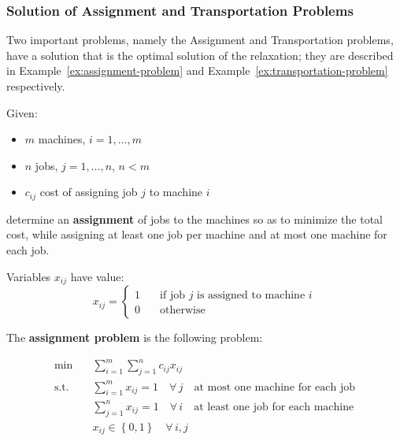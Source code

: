 \documentclass[english]{article}
\begin{document}
\subsubsection{Solution of Assignment and Transportation Problems}

Two important \ILP problems, namely the Assignment and Transportation problems, have a solution that is the optimal solution of the \LP relaxation;
they are described in Example~\ref{ex:assignment-problem} and Example~\ref{ex:transportation-problem} respectively.

\begin{example}
  \label{ex:assignment-problem}

  Given:
  \begin{itemize}
    \item \(m\) machines, \(i = 1, \dots, m\)
    \item \(n\) jobs, \(j = 1, \dots, n\), \(n < m\)
    \item \(c_{ij}\) cost of assigning job \(j\) to machine \(i\)
  \end{itemize}
  determine an \textbf{assignment} of jobs to the machines so as to minimize the total cost, while assigning at least one job per machine and at most one machine for each job.

  Variables \(x_{ij}\) have value:
  \[ x_{ij} = \begin{cases}
      1 \quad & \text{if job } j \text{ is assigned to machine } i \\
      0 \quad & \text{otherwise}
    \end{cases} \]

  The \textbf{assignment problem} is the following \ILP problem:

  \begin{align*}
    \min        & \quad \sum_{i=1}^m \sum_{j=1}^n c_{ij} x_{ij}                                                      \\
    \text{s.t.} & \quad \sum_{i=1}^{m} x_{ij} = 1 \quad \forall \, j \quad \text{at most one machine for each job}   \\
                & \quad \sum_{j=1}^{n} x_{ij} = 1 \quad \forall \, i  \quad \text{at least one job for each machine} \\
                & \quad x_{ij} \in \left\{ 0, 1 \right\} \quad \forall \, i, j
  \end{align*}
\end{example}
\end{document}
